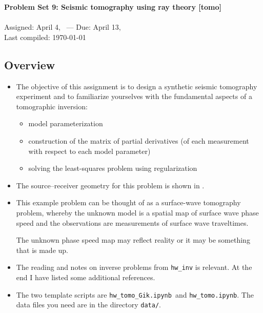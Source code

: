 \documentclass[11pt,titlepage,fleqn]{article}
\newcommand{\tfiletomo}{{\tt hw\_tomo.ipynb}}
\newcommand{\tfileGik}{{\tt hw\_tomo\_Gik.ipynb}}
\begin{document}

\begin{spacing}{1.2}
\centering
{\large \bf Problem Set 9: Seismic tomography using ray theory [tomo]} \\
\cltag\ \\
Assigned: April 4, \cyear\ --- Due: April 13, \cyear\ \\
Last compiled: \today
\end{spacing}


\subsection*{Overview}

\begin{itemize}

\item The objective of this assignment is to design a synthetic seismic tomography experiment and to familiarize yourselves with the fundamental aspects of a tomographic inversion:
%
\begin{itemize}
\item model parameterization
\item construction of the matrix of partial derivatives (of each measurement with respect to each model parameter)
\item solving the least-squares problem using regularization
\end{itemize}

\item The source--receiver geometry for this problem is shown in .

\item This example problem can be thought of as a surface-wave tomography problem, whereby the unknown model is a spatial map of surface wave phase speed and the observations are measurements of surface wave traveltimes.

The unknown phase speed map may reflect reality or it may be something that is made up.

\item The reading and notes on inverse problems from \verb+hw_inv+ is relevant.
At the end I have listed some additional references.
\nocite{Tape2007,Menke,AsterE2,Tarantola2005}

\item 
The two template scripts are \tfileGik\ and \tfiletomo.
The data files you need are in the directory \verb+data/+. \\

\end{itemize}
\end{document}
